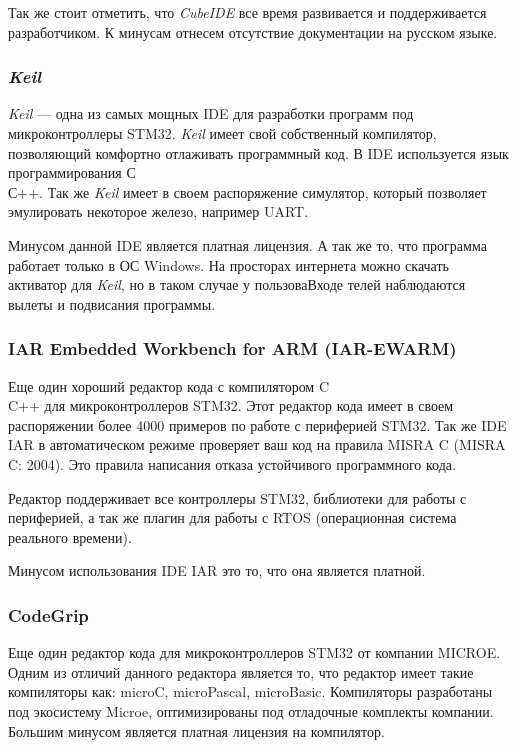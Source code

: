 Так же стоит отметить, что \textit{CubeIDE} все время развивается и поддерживается разработчиком. К минусам отнесем отсутствие документации на русском языке.

\subsubsection{\textit{Keil}}
\textit{Keil} — одна из самых мощных IDE для разработки программ под микроконтроллеры STM32. \textit{Keil} имеет свой собственный компилятор, позволяющий комфортно отлаживать программный код. В IDE используется язык программирования С\\С++. Так же \textit{Keil} имеет в своем распоряжение симулятор, который позволяет эмулировать некоторое железо, например UART.

Минусом данной IDE является платная лицензия. А так же то, что программа работает только в ОС Windows. На просторах интернета можно скачать активатор для \textit{Keil}, но в таком случае у пользоваВходе телей наблюдаются вылеты и подвисания программы.

\subsubsection{IAR Embedded Workbench for ARM (IAR-EWARM)}
Еще один хороший редактор кода с компилятором C\\C++ для микроконтроллеров STM32. Этот редактор кода имеет в своем распоряжении более 4000 примеров по работе с периферией STM32. Так же IDE IAR в автоматическом режиме проверяет ваш код на правила MISRA C (MISRA C: 2004). Это правила написания отказа устойчивого программного кода.

Редактор поддерживает все контроллеры STM32, библиотеки для работы с периферией, а так же плагин для работы с RTOS (операционная система реального времени).

Минусом использования IDE IAR это то, что она является платной.

\subsubsection{CodeGrip}
Еще один редактор кода для микроконтроллеров STM32 от компании MICROE. Одним из отличий данного редактора является то, что редактор имеет такие компиляторы как: microC, microPascal, microBasic. Компиляторы разработаны под экосистему Microe, оптимизированы под отладочные комплекты компании. Большим минусом является платная лицензия на компилятор.


